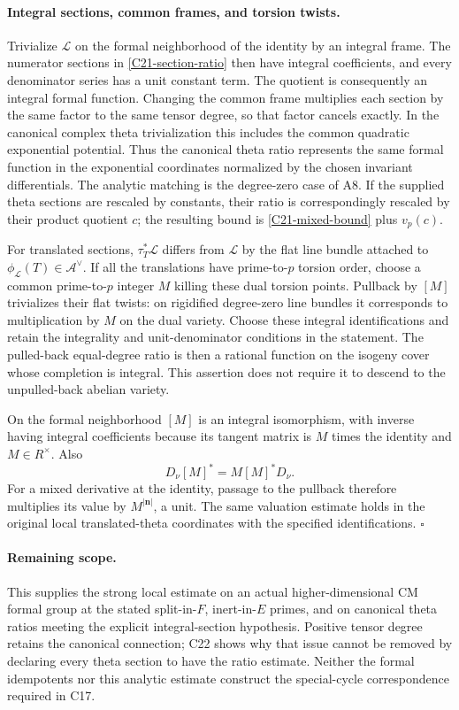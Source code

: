 \paragraph{Integral sections, common frames, and torsion twists.}
Trivialize $\mathscr L$ on the formal neighborhood of the
identity by an integral frame.  The numerator sections in
\eqref{C21-section-ratio} then have integral coefficients,
and every denominator series has a unit constant term.
The quotient is consequently an integral formal function.
Changing the common frame multiplies each section by the
same factor to the same tensor degree, so that factor cancels
exactly.  In the canonical complex theta trivialization this
includes the common quadratic exponential potential.
Thus the canonical theta ratio represents the same formal
function in the exponential coordinates normalized by the
chosen invariant differentials.  The analytic matching is
the degree-zero case of A8.  If the supplied theta sections
are rescaled by constants, their ratio is correspondingly
rescaled by their product quotient $c$; the resulting bound
is \eqref{C21-mixed-bound} plus $v_p(c)$.

For translated sections, $\tau_T^*\mathscr L$ differs from
$\mathscr L$ by the flat line bundle attached to
$\phi_{\mathscr L}(T)\in\mathcal A^\vee$.
If all the translations have prime-to-$p$ torsion order,
choose a common prime-to-$p$ integer $M$ killing these
dual torsion points.  Pullback by $[M]$ trivializes their
flat twists: on rigidified degree-zero line bundles it
corresponds to multiplication by $M$ on the dual variety.
Choose these integral identifications and retain the
integrality and unit-denominator conditions in the statement.
The pulled-back equal-degree ratio is then a rational function
on the isogeny cover whose completion is integral.
This assertion does not require it to descend to the
unpulled-back abelian variety.

On the formal neighborhood $[M]$ is an integral isomorphism,
with inverse having integral coefficients because its tangent
matrix is $M$ times the identity and $M\in R^\times$.
Also
\[
 D_\nu[M]^*=M[M]^*D_\nu.
\]
For a mixed derivative at the identity, passage to the
pullback therefore multiplies its value by
$M^{|\mathbf n|}$, a unit.  The same valuation estimate
holds in the original local translated-theta coordinates
with the specified identifications. \hfill$\square$

\paragraph{Remaining scope.}
This supplies the strong local estimate on an actual
higher-dimensional CM formal group at the stated split-in-$F$,
inert-in-$E$ primes, and on canonical theta ratios meeting
the explicit integral-section hypothesis.  Positive tensor
degree retains the canonical connection; C22 shows why
that issue cannot be removed by declaring every theta
section to have the ratio estimate.  Neither the formal
idempotents nor this analytic estimate construct the
special-cycle correspondence required in C17.
